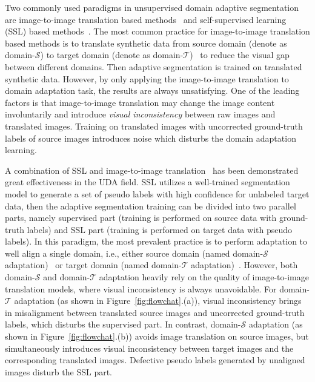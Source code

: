 \documentclass[10pt,twocolumn,letterpaper]{article}
\begin{document}
Two commonly used paradigms in unsupervised domain adaptive segmentation are image-to-image translation based methods~\cite{murez2018image, hoffman2018cycada} and self-supervised learning (SSL) based methods~\cite{zou2018unsupervised, zou2019confidence, zhang2019category,Two-phase}. The most common practice for image-to-image translation based methods is to translate synthetic data from source domain (denote as domain-$\mathcal{S}$) to target domain (denote as domain-$\mathcal{T}$)~\cite{hoffman2018cycada,chang2019all} to reduce the visual gap between different domains. Then adaptive segmentation is trained on translated synthetic data. However, by only applying the image-to-image translation to domain adaptation task, the results are always unsatisfying. One of the leading factors is that image-to-image translation may change the image content involuntarily and introduce \emph{visual inconsistency} between raw images and translated images. Training on translated images with uncorrected ground-truth labels of source images introduces noise which disturbs the domain adaptation learning.

A combination of SSL and image-to-image translation~\cite{li2019bidirectional, yang2020label, kim2020learning} has been demonstrated great effectiveness in the UDA field. SSL utilizes a well-trained segmentation model to generate a set of pseudo labels with high confidence for unlabeled target data, then the adaptive segmentation training can be divided into two parallel parts, namely supervised part (training is performed on source data with ground-truth labels) and SSL part (training is performed on target data with pseudo labels). In this paradigm, the most prevalent practice is to perform adaptation to well align a single domain, i.e., either source domain (named domain-$\mathcal{S}$ adaptation)~\cite{li2019bidirectional, kim2020learning} or target domain (named domain-$\mathcal{T}$ adaptation)~\cite{yang2020label}.
However, both domain-$\mathcal{S}$ and domain-$\mathcal{T}$ adaptation heavily rely on the quality of image-to-image translation models, where visual inconsistency is always unavoidable. For domain-$\mathcal{T}$ adaptation (as shown in Figure~\ref{fig:flowchat}.(a)), visual inconsistency brings in misalignment between translated source images and uncorrected ground-truth labels, which disturbs the supervised part. In contrast, domain-$\mathcal{S}$ adaptation (as shown in Figure~\ref{fig:flowchat}.(b)) avoids image translation on source images, but simultaneously introduces visual inconsistency between target images and the corresponding translated images. Defective pseudo labels generated by unaligned images disturb the SSL part.
\end{document}
